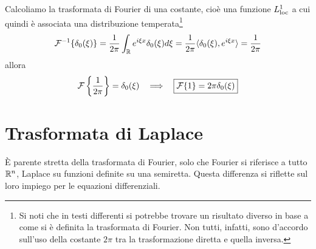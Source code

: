 Calcoliamo la trasformata di Fourier di una costante, cioè una funzione $L^{1}_{\operatorname{loc}}$ a cui quindi è associata una distribuzione temperata\footnote{Si noti che in testi differenti si potrebbe trovare un risultato diverso in base a come si è definita la trasformata di Fourier. Non tutti, infatti, sono d'accordo sull'uso della costante $2\pi $ tra la trasformazione diretta e quella inversa.}
\begin{equation*}
\mathcal{F}^{- 1}\{\delta_{0}(\xi)\} = \frac{1}{2\pi}\int_{\mathbb{R}} e^{i\xi x} \delta_{0}(\xi) d\xi = \frac{1}{2\pi} \langle \delta_{0}(\xi), e^{i\xi x} \rangle = \frac{1}{2\pi}
\end{equation*}
allora
\begin{equation*}
\mathcal{F}\left\{\frac{1}{2\pi}\right\} = \delta_{0}(\xi) \ \ \implies \ \ \boxed{\mathcal{F}\{1\} = 2\pi \delta_{0}(\xi)}
\end{equation*}

\section{Trasformata di Laplace}

È parente stretta della trasformata di Fourier, solo che Fourier si riferisce a tutto $\mathbb{R}^{n}$, Laplace su funzioni definite su una semiretta. Questa differenza si riflette sul loro impiego per le equazioni differenziali.

